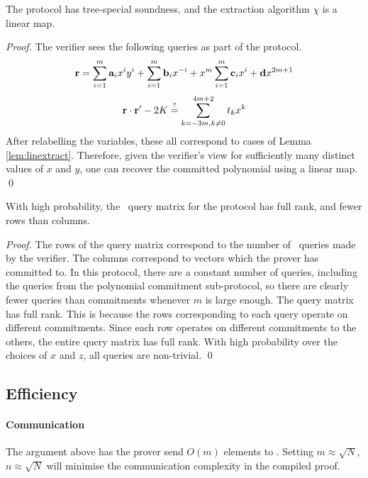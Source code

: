 \begin{lemma}
The protocol has tree-special soundness, and the extraction algorithm $\chi$ is a linear map.
\end{lemma}

\begin{proof}
The verifier sees the following queries as part of the protocol.
\[
\vec{r} =\sum_{i=1}^m\vec{a}_{i}x^{i} y^i+\sum_{i=1}^m\vec{b}_{i} x^{-i}+x^m \sum_{i=1}^m\vec{c}_{i} x^{i}+\vec{d}x^{2m+1}\\
\]
$$\vec{r}\cdot \vec{r}'-2K \vereq \sum_{k=-3m,k \neq 0}^{4m+2}t_k x^{k}$$
After relabelling the variables, these all correspond to cases of Lemma \ref{lem:linextract}. Therefore, given the verifier's view for sufficiently many distinct values of $x$ and $y$, one can recover the committed polynomial using a linear map. \qed
\end{proof}

\begin{lemma}
With high probability, the \ILC\ query matrix for the protocol has full rank, and fewer rows than columns.
\end{lemma}

\begin{proof}
The rows of the query matrix correspond to the number of \ILC\ queries made by the verifier. The columns correspond to vectors which the prover has committed to. In this protocol, there are a constant number of queries, including the queries from the polynomial commitment sub-protocol, so there are clearly fewer queries than commitments whenever $m$ is large enough. The query matrix has full rank. This is because the rows corresponding to each query operate on different commitments. Since each row operates on different commitments to the others, the entire query matrix has full rank. With high probability over the choices of $x$ and $z$, all queries are non-trivial. \qed
\end{proof}

\subsection{Efficiency}

\paragraph{Communication} The argument above has the prover send $O(m)$ elements to \ILC. Setting $m \approx \sqrt{N}$, $n\approx \sqrt{N}$ will minimise the communication complexity in the compiled proof.%
%
